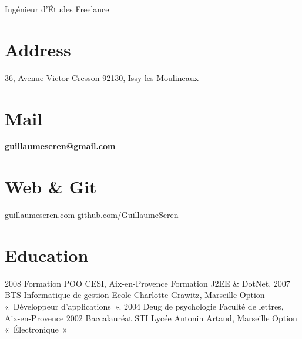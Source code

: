 
      {Ingénieur d'Études Freelance}

\begin{aside}
  \section{Address}
    36, Avenue Victor Cresson
    92130, Issy les Moulineaux
    ~
  \section{Mail}
    \href{mailto:guillaumeseren@gmail.com}{\textbf{guillaumeseren@gmail.com}}
    ~
  \section{Web \& Git}
    \href{http://guillaumeseren.com/}{guillaumeseren.com}
    \href{https://github.com/GuillaumeSeren}{github.com/GuillaumeSeren}
    ~
\end{aside}

\section{Education}
\begin{entrylist}
  \entry
    {2008}
    {Formation POO}
    {CESI, Aix-en-Provence}
    {Formation J2EE \& DotNet.}
  \entry
    {2007}
    {BTS Informatique de gestion}
    {Ecole Charlotte Grawitz, Marseille}
    {Option « Développeur d'applications ».}
  \entry
    {2004}
    {Deug de psychologie}
    {Faculté de lettres, Aix-en-Provence}
    {}
  \entry
    {2002}
    {Baccalauréat STI}
    {Lycée Antonin Artaud, Marseille}
    {Option « Électronique »}
\end{entrylist}

